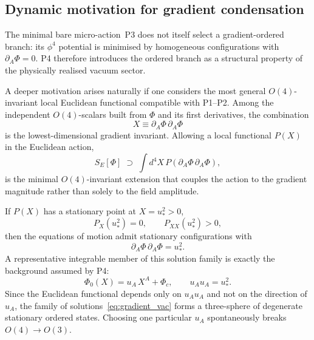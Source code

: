 \documentclass[11pt,a4paper]{article}
\numberwithin{equation}{section}
\begin{document}
\subsection{Dynamic motivation for gradient condensation}
\label{sec:condensate_dynamics}

The minimal bare micro-action~P3 does not itself select a gradient-ordered
branch: its $\phi^4$ potential is minimised by homogeneous configurations
with $\partial_A\Phi=0$.  P4 therefore introduces the ordered branch as a
structural property of the physically realised vacuum sector.

A deeper motivation arises naturally if one considers the most general
$O(4)$-invariant local Euclidean functional compatible with P1--P2.
Among the independent $O(4)$-scalars built from $\Phi$ and its
first derivatives, the combination
\begin{equation}
  X \equiv \partial_A\Phi\,\partial_A\Phi
  \label{eq:X_def}
\end{equation}
is the lowest-dimensional gradient invariant.  Allowing a local
functional $P(X)$ in the Euclidean action,
\begin{equation}
  S_E[\Phi]
  \;\supset\;
  \int d^4X\,P\!\left(\partial_A\Phi\,\partial_A\Phi\right),
  \label{eq:PX_action}
\end{equation}
is the minimal $O(4)$-invariant extension that couples the action to the
gradient magnitude rather than solely to the field amplitude.

If $P(X)$ has a stationary point at $X = u_*^2 > 0$,
\begin{equation}
  P_X(u_*^2) = 0,\qquad P_{XX}(u_*^2) > 0,
  \label{eq:PX_minimum}
\end{equation}
then the equations of motion admit stationary configurations with
\begin{equation}
  \partial_A\Phi\,\partial_A\Phi = u_*^2.
  \label{eq:gradient_branch}
\end{equation}
A representative integrable member of this solution family is
exactly the background assumed by P4:
\begin{equation}
  \Phi_0(X) = u_A\,X^A + \Phi_c,
  \qquad
  u_A u_A = u_*^2.
  \label{eq:gradient_vac}
\end{equation}
Since the Euclidean functional depends only on $u_A u_A$ and not on
the direction of $u_A$, the family of solutions~\eqref{eq:gradient_vac}
forms a three-sphere of degenerate stationary ordered states.  Choosing
one particular $u_A$ spontaneously breaks $O(4)\to O(3)$.
\end{document}

